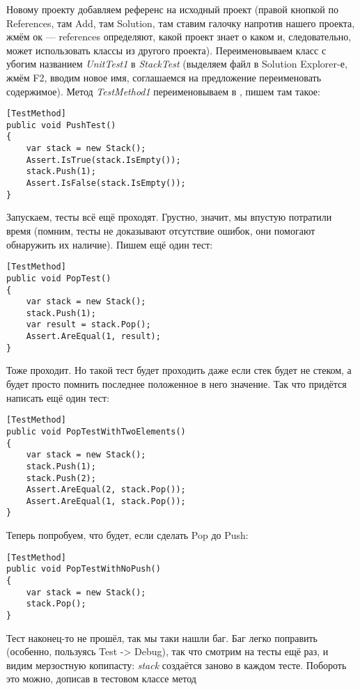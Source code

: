 \documentclass[a5paper]{article}
\begin{document}
Новому проекту добавляем референс на исходный проект (правой кнопкой по References, там Add, там Solution, там ставим галочку напротив нашего проекта, жмём ок --- references определяют, какой проект знает о каком и, следовательно, может использовать классы из другого проекта). Переименовываем класс с убогим названием \textit{UnitTest1} в \textit{StackTest} (выделяем файл в Solution Explorer-е, жмём F2, вводим новое имя, соглашаемся на предложение переименовать содержимое). Метод \textit{TestMethod1} переименовываем в , пишем там такое:

\begin{verbatim}
[TestMethod]
public void PushTest()
{
    var stack = new Stack();
    Assert.IsTrue(stack.IsEmpty());
    stack.Push(1);
    Assert.IsFalse(stack.IsEmpty());
}
\end{verbatim}

Запускаем, тесты всё ещё проходят. Грустно, значит, мы впустую потратили время (помним, тесты не доказывают отсутствие ошибок, они помогают обнаружить их наличие). Пишем ещё один тест:

\begin{verbatim}
[TestMethod]
public void PopTest()
{
    var stack = new Stack();
    stack.Push(1);
    var result = stack.Pop();
    Assert.AreEqual(1, result);
}
\end{verbatim}

Тоже проходит. Но такой тест будет проходить даже если стек будет не стеком, а будет просто помнить последнее положенное в него значение. Так что придётся написать ещё один тест:

\begin{verbatim}
[TestMethod]
public void PopTestWithTwoElements()
{
    var stack = new Stack();
    stack.Push(1);
    stack.Push(2);
    Assert.AreEqual(2, stack.Pop());
    Assert.AreEqual(1, stack.Pop());
}
\end{verbatim}

Теперь попробуем, что будет, если сделать Pop до Push:

\begin{verbatim}
[TestMethod]
public void PopTestWithNoPush()
{
    var stack = new Stack();
    stack.Pop();
}
\end{verbatim}

Тест наконец-то не прошёл, так мы таки нашли баг. Баг легко поправить (особенно, пользуясь Test -> Debug), так что смотрим на тесты ещё раз, и видим мерзостную копипасту: \textit{stack} создаётся заново в каждом тесте. Побороть это можно, дописав в тестовом классе метод 
\end{document}
